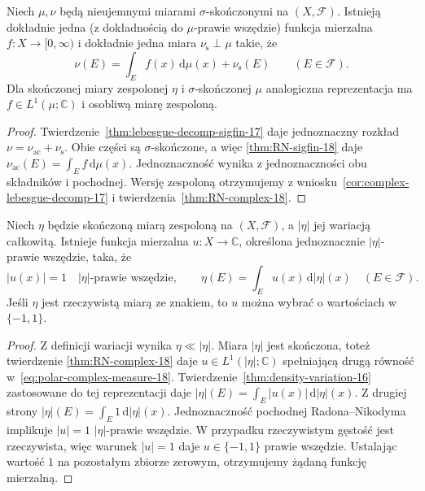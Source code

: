 \begin{wniosek}
\label{cor:RN-lebesgue-sum-18}
Niech $\mu,\nu$ będą nieujemnymi miarami
$\sigma$-skończonymi na $(X,\mathcal F)$.
Istnieją dokładnie jedna (z dokładnością do
$\mu$-prawie wszędzie) funkcja mierzalna
$f:X\to[0,\infty)$ i dokładnie jedna miara
$\nu_{\mathrm{s}}\perp\mu$ takie, że
\begin{equation}\label{eq:RN-Lebesgue-decomp-18}
\nu(E)=\int_E f(x)\,\mathrm d\mu(x)+\nu_{\mathrm{s}}(E)
\qquad(E\in\mathcal F).
\end{equation}
Dla skończonej miary zespolonej $\eta$ i
$\sigma$-skończonej $\mu$ analogiczna reprezentacja ma
$f\in L^1(\mu;\mathbb C)$ i osobliwą miarę zespoloną.
\end{wniosek}
\begin{proof}
Twierdzenie~\ref{thm:lebesgue-decomp-sigfin-17}
daje jednoznaczny rozkład $\nu=\nu_{\mathrm{ac}}+
\nu_{\mathrm{s}}$. Obie części są $\sigma$-skończone,
a więc \ref{thm:RN-sigfin-18} daje
$\nu_{\mathrm{ac}}(E)=\int_Ef\,\mathrm d\mu(x)$.
Jednoznaczność wynika z jednoznaczności obu składników
i pochodnej. Wersję zespoloną otrzymujemy z
wniosku~\ref{cor:complex-lebesgue-decomp-17}
i twierdzenia~\ref{thm:RN-complex-18}.
\end{proof}

\begin{twierdzenie}
\label{thm:polar-complex-measure-18}
Niech $\eta$ będzie skończoną miarą zespoloną
na $(X,\mathcal F)$, a $|\eta|$ jej wariacją
całkowitą. Istnieje funkcja mierzalna
$u:X\to\mathbb C$, określona jednoznacznie
$|\eta|$-prawie wszędzie, taka, że
\begin{equation}\label{eq:polar-complex-measure-18}
 |u(x)|=1\quad |\eta|\text{-prawie wszędzie},\qquad
 \eta(E)=\int_Eu(x)\,\mathrm d|\eta|(x)
 \quad(E\in\mathcal F).
\end{equation}
Jeśli $\eta$ jest rzeczywistą miarą ze znakiem, to
$u$ można wybrać o wartościach w $\{-1,1\}$.
\end{twierdzenie}
\begin{proof}
Z definicji wariacji wynika $\eta\ll|\eta|$.
Miara $|\eta|$ jest skończona, toteż twierdzenie
\ref{thm:RN-complex-18} daje $u\in L^1(|\eta|;\mathbb C)$
spełniającą drugą równość w~\eqref{eq:polar-complex-measure-18}.
Twierdzenie~\ref{thm:density-variation-16} zastosowane
do tej reprezentacji daje
$|\eta|(E)=\int_E|u(x)|\,\mathrm d|\eta|(x)$.
Z drugiej strony $|\eta|(E)=\int_E1\,\mathrm d|\eta|(x)$.
Jednoznaczność pochodnej Radona--Nikodyma implikuje
$|u|=1$ $|\eta|$-prawie wszędzie.
W przypadku rzeczywistym gęstość jest rzeczywista,
więc warunek $|u|=1$ daje $u\in\{-1,1\}$
prawie wszędzie. Ustalając wartość $1$ na pozostałym
zbiorze zerowym, otrzymujemy żądaną funkcję mierzalną.
\end{proof}

